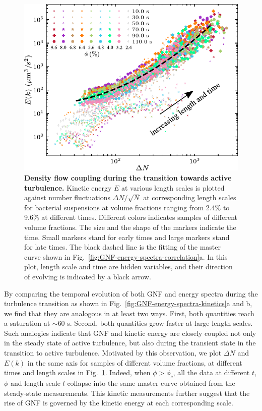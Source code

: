 \begin{figure}[!ht]
\begin{center}
\includegraphics[width=4.5in]{figs/5-GNF/9.pdf}
\caption[Density flow coupling during the transition towards active turbulence]
{
\textbf{Density flow coupling during the transition towards active turbulence.}
Kinetic energy $E$ at various length scales is plotted against number fluctuations $\Delta N/\sqrt N$ at corresponding length scales for bacterial suspensions at volume fractions ranging from 2.4\% to 9.6\% at different times. Different colors indicates samples of different volume fractions. The size and the shape of the markers indicate the time. Small markers stand for early times and large markers stand for late times. The black dashed line is the fitting of the master curve shown in Fig.~\ref{fig:GNF-energy-spectra-correlation}a. In this plot, length scale and time are hidden variables, and their direction of evolving is indicated by a black arrow.
}
\label{fig:GNF-energy-spectra-correlation-transient}
\end{center}
\end{figure}

By comparing the temporal evolution of both GNF and energy spectra during the turbulence transition as shown in Fig.~\ref{fig:GNF-energy-spectra-kinetics}a and b, we find that they are analogous in at least two ways. First, both quantities reach a saturation at $\sim 60$ s. Second, both quantities grow faster at large length scales. Such analogies indicate that GNF and kinetic energy are  closely coupled not only in the steady state of active turbulence, but also during the transient state in the transition to active turbulence.
Motivated by this observation, we plot $\Delta N$ and $E(k)$ in the same axis for samples of different volume fractions, at different times and length scales in Fig.~\ref{fig:GNF-energy-spectra-correlation-transient}. Indeed, when $\phi>\phi_c$, all the data at different $t$, $\phi$ and length scale $l$ collapse into the same master curve obtained from the steady-state measurements. This kinetic measurements further suggest that the rise of GNF is governed by the kinetic energy at each corresponding scale.



